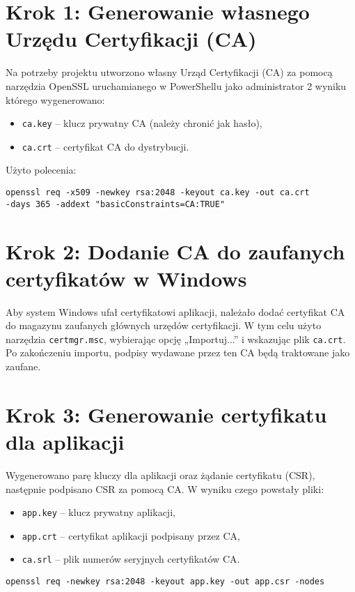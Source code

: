\documentclass{article}
\begin{document}
\section*{Krok 1: Generowanie własnego Urzędu Certyfikacji (CA)}

Na potrzeby projektu utworzono własny Urząd Certyfikacji (CA) za pomocą narzędzia OpenSSL uruchamianego w PowerShellu jako administrator 2 wyniku którego wygenerowano:
\begin{itemize}
  \item \texttt{ca.key} – klucz prywatny CA (należy chronić jak hasło),
  \item \texttt{ca.crt} – certyfikat CA do dystrybucji.
\end{itemize}
Użyto polecenia:

\begin{verbatim}
openssl req -x509 -newkey rsa:2048 -keyout ca.key -out ca.crt
-days 365 -addext "basicConstraints=CA:TRUE" 
\end{verbatim}

\section*{Krok 2: Dodanie CA do zaufanych certyfikatów w Windows}

Aby system Windows ufał certyfikatowi aplikacji, należało dodać certyfikat CA do magazynu zaufanych głównych urzędów certyfikacji. W tym celu użyto narzędzia \texttt{certmgr.msc}, wybierając opcję „Importuj...” i wskazując plik \texttt{ca.crt}. Po zakończeniu importu, podpisy wydawane przez ten CA będą traktowane jako zaufane.

\section*{Krok 3: Generowanie certyfikatu dla aplikacji}

Wygenerowano parę kluczy dla aplikacji oraz żądanie certyfikatu (CSR), następnie podpisano CSR za pomocą CA. W wyniku czego powstały pliki:
\begin{itemize}
  \item \texttt{app.key} – klucz prywatny aplikacji,
  \item \texttt{app.crt} – certyfikat aplikacji podpisany przez CA,
  \item \texttt{ca.srl} – plik numerów seryjnych certyfikatów CA.
\end{itemize}

\begin{verbatim}
openssl req -newkey rsa:2048 -keyout app.key -out app.csr -nodes
\end{verbatim}
\end{document}
